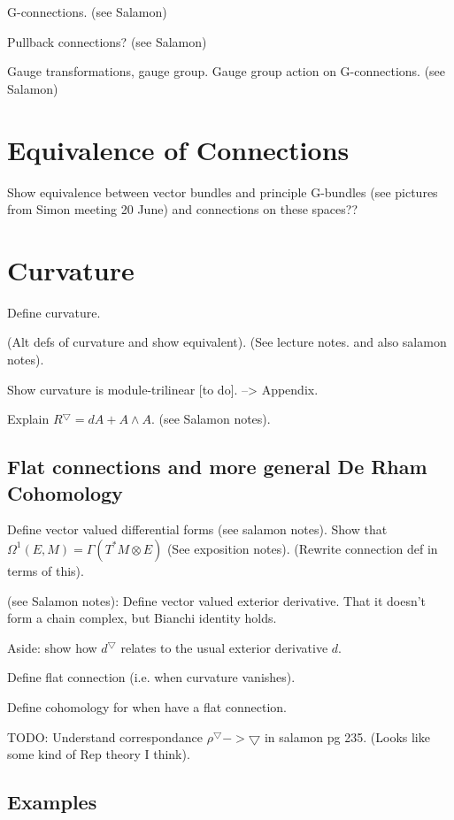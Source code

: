 \documentclass[a4paper]{article}
\theoremstyle{definition} \newtheorem*{definition}{Definition}
\theoremstyle{definition} \newtheorem*{definitions}{Definitions}
\theoremstyle{plain} \newtheorem{theorem}{Theorem}[section]
\theoremstyle{plain} \newtheorem{proposition}[theorem]{Proposition}
\theoremstyle{plain} \newtheorem{corollary}[theorem]{Corollary}
\theoremstyle{plain} \newtheorem{lemma}[theorem]{Lemma}
\theoremstyle{plain} \newtheorem{example}[theorem]{Example}
\begin{document}
G-connections. (see Salamon)

Pullback connections? (see Salamon)

Gauge transformations, gauge group. Gauge group action on G-connections. (see Salamon)

\section{Equivalence of Connections}
Show equivalence between vector bundles and principle G-bundles (see pictures from Simon meeting 20 June)
and connections on these spaces??

\section{Curvature}

Define curvature. 

(Alt defs of curvature and show equivalent). (See  lecture notes. and also salamon notes).

Show curvature is module-trilinear [to do]. --> Appendix.

Explain $R^\bigtriangledown = dA + A\wedge A$. (see Salamon notes).

\subsection{Flat connections and more general De Rham Cohomology}

Define vector valued differential forms (see salamon notes). 
Show that $\Omega^1 (E, M) = \Gamma (T^*M\otimes E)$ (See exposition notes). 
(Rewrite connection def in terms of this).

(see Salamon notes):
Define vector valued exterior derivative. That it doesn't form a chain complex, but Bianchi identity holds. 

Aside: show how $d^\bigtriangledown$ relates to the usual exterior derivative $d$.

Define flat connection (i.e. when curvature vanishes).

Define cohomology for when have a flat connection.

TODO: Understand correspondance $\rho^\bigtriangledown -> \bigtriangledown$ in salamon pg 235. (Looks like some kind of Rep theory I think).

\subsection{Examples}
\end{document}
